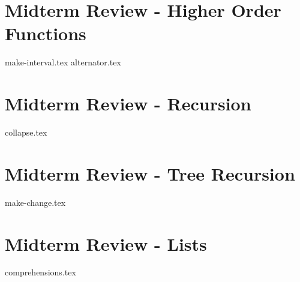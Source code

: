 \documentclass{exam}
\begin{document}
\newpage
\section{Midterm Review - Higher Order Functions}
\begin{questions}
{make-interval.tex}
{alternator.tex}
\end{questions}

\section{Midterm Review - Recursion}
\begin{questions}
{collapse.tex}
\end{questions}

\section{Midterm Review - Tree Recursion}
\begin{questions}
{make-change.tex}
\end{questions}

\newpage
\section{Midterm Review - Lists}
\begin{questions}
{comprehensions.tex}
\end{questions}
\end{document}
